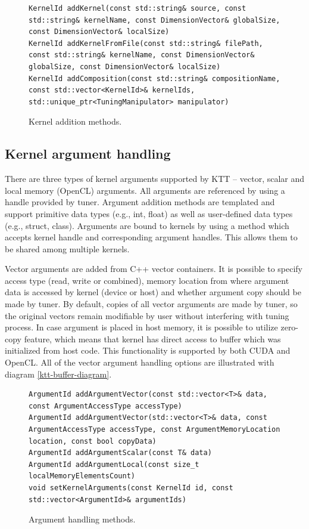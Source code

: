 \documentclass
[
    digital, %
    oneside, %
    table, %
    nolof, %
    nolot, %
    nocover %
]{fithesis3}
\begin{document}
\begin{figure}
\begin{adjustwidth}{-1cm}{-1cm}
\begin{lstlisting}
KernelId addKernel(const std::string& source, const std::string& kernelName, const DimensionVector& globalSize, const DimensionVector& localSize)
KernelId addKernelFromFile(const std::string& filePath, const std::string& kernelName, const DimensionVector& globalSize, const DimensionVector& localSize)
KernelId addComposition(const std::string& compositionName, const std::vector<KernelId>& kernelIds, std::unique_ptr<TuningManipulator> manipulator)
\end{lstlisting}
\caption{Kernel addition methods.}
\label{ktt-kernel-methods}
\end{adjustwidth}
\end{figure}

\subsection{Kernel argument handling}
There are three types of kernel arguments supported by KTT -- vector, scalar and local memory (OpenCL) arguments. All arguments are referenced by using
a handle provided by tuner. Argument addition methods are templated and support primitive data types (e.g., int, float) as well as user-defined data
types (e.g., struct, class). Arguments are bound to kernels by using a method which accepts kernel handle and corresponding argument handles. This allows
them to be shared among multiple kernels.

Vector arguments are added from C++ vector containers. It is possible to specify access type (read, write or combined), memory location from where
argument data is accessed by kernel (device or host) and whether argument copy should be made by tuner. By default, copies of all vector arguments
are made by tuner, so the original vectors remain modifiable by user without interfering with tuning process. In case argument is placed in host
memory, it is possible to utilize zero-copy feature, which means that kernel has direct access to buffer which was initialized from host code. This
functionality is supported by both CUDA and OpenCL. All of the vector argument handling options are illustrated with diagram \ref{ktt-buffer-diagram}.

\begin{figure}
\begin{adjustwidth}{-1cm}{-1cm}
\begin{lstlisting}
ArgumentId addArgumentVector(const std::vector<T>& data, const ArgumentAccessType accessType)
ArgumentId addArgumentVector(std::vector<T>& data, const ArgumentAccessType accessType, const ArgumentMemoryLocation location, const bool copyData)
ArgumentId addArgumentScalar(const T& data)
ArgumentId addArgumentLocal(const size_t localMemoryElementsCount)
void setKernelArguments(const KernelId id, const std::vector<ArgumentId>& argumentIds)
\end{lstlisting}
\caption{Argument handling methods.}
\label{ktt-argument-methods}
\end{adjustwidth}
\end{figure}
\end{document}
